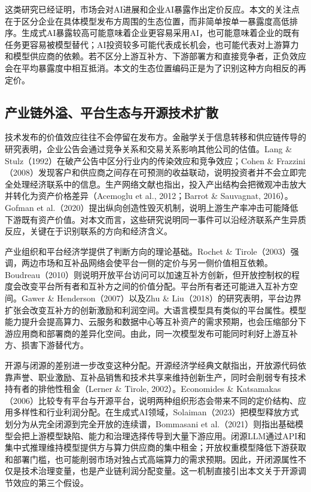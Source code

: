 \documentclass[11pt,fontset=fandol,a4paper]{ctexart}
\begin{document}
这类研究已经证明，市场会对AI进展和企业AI暴露作出定价反应。本文的关注点在于区分企业在具体模型发布方周围的生态位置，而非简单按单一暴露度高低排序。生成式AI暴露较高可能意味着企业更容易采用AI，也可能意味着企业的既有任务更容易被模型替代；AI投资较多可能代表成长机会，也可能代表对上游算力和模型供应商的依赖。若不区分上游互补方、下游部署方和直接竞争者，正负效应会在平均暴露度中相互抵消。本文的生态位置编码正是为了识别这种方向相反的再定价。

\subsection{产业链外溢、平台生态与开源技术扩散}

技术发布的价值效应往往不会停留在发布方。金融学关于信息转移和供应链传导的研究表明，企业公告会通过竞争关系和交易关系影响其他公司的估值。Lang \& Stulz（1992）在破产公告中区分行业内的传染效应和竞争效应；Cohen \& Frazzini（2008）发现客户和供应商之间存在可预测的收益联动，说明投资者并不会立即完全处理经济联系中的信息。生产网络文献也指出，投入产出结构会把微观冲击放大并转化为资产价格差异（Acemoglu et al., 2012；Barrot \& Sauvagnat, 2016）。Gofman et al.（2020）提出纵向创造性毁灭机制，说明上游生产率冲击可能降低下游既有资产价值。对本文而言，这些研究说明同一事件可以沿经济联系产生异质反应，关键在于识别联系的方向和经济含义。

产业组织和平台经济学提供了判断方向的理论基础。Rochet \& Tirole（2003）强调，两边市场和互补品网络会使平台一侧的定价与另一侧价值相互依赖。Boudreau（2010）则说明开放平台访问可以加速互补方创新，但开放控制权的程度会改变平台所有者和互补方之间的价值分配。平台所有者还可能进入互补方空间。Gawer \& Henderson（2007）以及Zhu \& Liu（2018）的研究表明，平台边界扩张会改变互补方的创新激励和利润空间。大语言模型具有类似的平台属性。模型能力提升会提高算力、云服务和数据中心等互补资产的需求预期，也会压缩部分下游应用商和部署商的差异化空间。由此，同一次模型发布可能同时利好上游互补方、损害下游替代方。

开源与闭源的差别进一步改变这种分配。开源经济学经典文献指出，开放源代码依靠声誉、职业激励、互补品销售和技术共享来维持创新生产，同时会削弱专有技术持有者的排他性租金（Lerner \& Tirole, 2002）。Economides \& Katsamakas（2006）比较专有平台与开源平台，说明两种组织形态会带来不同的定价结构、应用多样性和行业利润分配。在生成式AI领域，Solaiman（2023）把模型释放方式划分为从完全闭源到完全开放的连续谱，Bommasani et al.（2021）则指出基础模型会把上游模型缺陷、能力和治理选择传导到大量下游应用。闭源LLM通过API和集中式推理维持模型提供方与算力供应商的集中租金；开放权重模型降低下游获取和部署门槛，也可能削弱市场对独占式高端算力的需求预期。因此，开闭源属性不仅是技术治理变量，也是产业链利润分配变量。这一机制直接引出本文关于开源调节效应的第三个假设。
\end{document}
